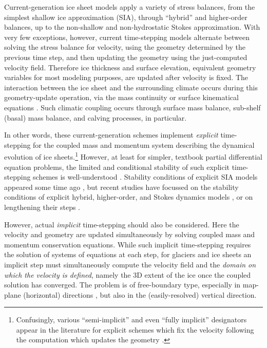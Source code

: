 \documentclass[review,letterpaper]{igs}
\begin{document}
Current-generation ice sheet models apply a variety of stress balances, from the simplest shallow ice approximation (SIA), through ``hybrid'' \citep{Robinsonetal2022,Winkelmannetal2011} and higher-order balances, up to the non-shallow and non-hydrostatic Stokes approximation.  With very few exceptions, however, current time-stepping models alternate between solving the stress balance for velocity, using the geometry determined by the previous time step, and then updating the geometry using the just-computed velocity field.  Therefore ice thickness and surface elevation, equivalent geometry variables for most modeling purposes, are updated after velocity is fixed.  The interaction between the ice sheet and the surrounding climate occurs during this geometry-update operation, via the mass continuity or surface kinematical equations \citep{GreveBlatter2009}.  Such climatic coupling occurs through surface mass balance, sub-shelf (basal) mass balance, and calving processes, in particular.

In other words, these current-generation schemes implement \emph{explicit} time-stepping for the coupled mass and momentum system describing the dynamical evolution of ice sheets.\footnote{Confusingly, various ``semi-implicit'' and even ``fully implicit'' designators appear in the literature for explicit schemes which fix the velocity following the computation which updates the geometry \citep[for example]{Chengetal2017}.}  However, at least for simpler, textbook partial differential equation problems, the limited and conditional stability of such explicit time-stepping schemes is well-understood \citep{LeVeque2007}.  Stability conditions of explicit SIA models appeared some time ago \citep[e.g.][]{HindmarshPayne1996}, but recent studies have focussed on the stability conditions of explicit hybrid, higher-order, and Stokes dynamics models \citep{Chengetal2017,Robinsonetal2022}, or on lengthening their steps \citep{LofgrenAhlkronaHelanow2021}.

However, actual \emph{implicit} time-stepping \citep{LeVeque2007} should also be considered.  Here the velocity and geometry are updated simultaneously by solving coupled mass and momentum conservation equations.  While such implicit time-stepping requires the solution of systems of equations at each step, for glaciers and ice sheets an implicit step must simultaneously compute the velocity field and the \emph{domain on which the velocity is defined}, namely the 3D extent of the ice once the coupled solution has converged.  The problem is of free-boundary type, especially in map-plane (horizontal) directions \citep{SchoofHewitt2013}, but also in the (easily-resolved) vertical direction.
\end{document}
